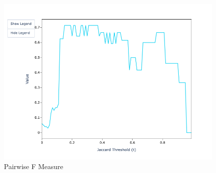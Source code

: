 \documentclass[a4paper,twoside]{article}
\begin{document}
\begin{figure}
\begin{minipage}{0.32\textwidth}
            \includegraphics[width=\textwidth]{sample-usage/mini-alg-pf}
            \caption{Pairwise F Measure}
        \end{minipage}
    \end{figure}
\end{document}
